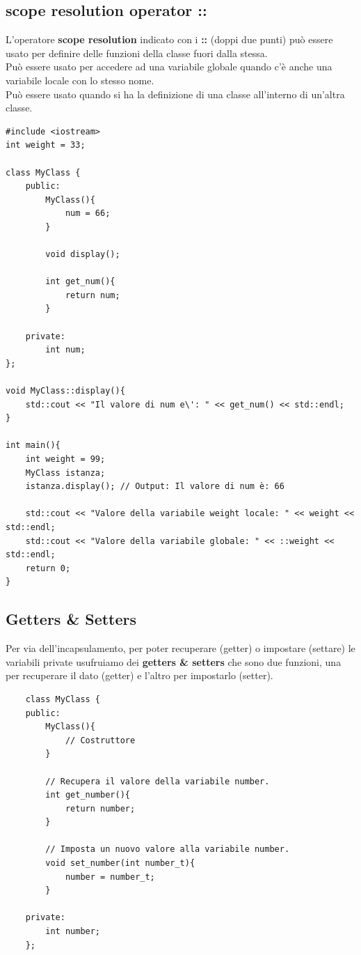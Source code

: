 
\subsection{scope resolution operator ::}

\textsf{\small L'operatore \textbf{scope resolution} indicato con i \textbf{::} (doppi due punti) può essere usato per definire delle funzioni della classe fuori dalla stessa.} \\

\textsf{\small Può essere usato per accedere ad una variabile globale quando c'è anche una variabile locale con lo stesso nome.} \\

\textsf{\small Può essere usato quando si ha la definizione di una classe all'interno di un'altra classe.} \\

\begin{lstlisting}
#include <iostream>
int weight = 33;
	
class MyClass {
	public:
		MyClass(){
			num = 66;
		}	
	
		void display();
		
		int get_num(){
			return num;
		}
	
	private:
		int num;
};

void MyClass::display(){
	std::cout << "Il valore di num e\': " << get_num() << std::endl;
}

int main(){
	int weight = 99;
	MyClass istanza;
	istanza.display(); // Output: Il valore di num è: 66
	
	std::cout << "Valore della variabile weight locale: " << weight << std::endl;
	std::cout << "Valore della variabile globale: " << ::weight << std::endl; 
	return 0;
}
\end{lstlisting}

\subsection{Getters \& Setters}

\textsf{\small Per via dell'incapsulamento, per poter recuperare (getter) o impostare (settare) le variabili private usufruiamo dei \textbf{getters \& setters} che sono due funzioni, una per recuperare il dato (getter) e l'altro per impostarlo (setter).} \\

\begin{lstlisting}
	class MyClass {
	public:
		MyClass(){
			// Costruttore
		}
	
		// Recupera il valore della variabile number.
		int get_number(){
			return number;
		}
		
		// Imposta un nuovo valore alla variabile number.
		void set_number(int number_t){
			number = number_t;
		}
	
	private:
		int number;
	};
\end{lstlisting}

